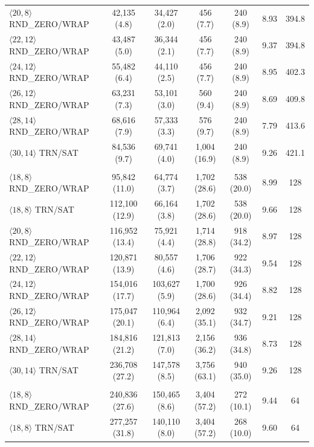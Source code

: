 \begin{table}[p]
\begin{tabular}{lcccccc}
$\langle 20,8\rangle$ RND\_ZERO/WRAP & 42,135 (4.8) & 34,427 (2.0) & 456 (7.7) & 240 (8.9) & 8.93 & 394.8 \\
$\langle 22,12\rangle$ RND\_ZERO/WRAP & 43,487 (5.0) & 36,344 (2.1) & 456 (7.7) & 240 (8.9) & 9.37 & 394.8 \\
$\langle 24,12\rangle$ RND\_ZERO/WRAP & 55,482 (6.4) & 44,110 (2.5) & 456 (7.7) & 240 (8.9) & 8.95 & 402.3 \\
$\langle 26,12\rangle$ RND\_ZERO/WRAP & 63,231 (7.3) & 53,101 (3.0) & 560 (9.4) & 240 (8.9) & 8.69 & 409.8 \\
$\langle 28,14\rangle$ RND\_ZERO/WRAP & 68,616 (7.9) & 57,333 (3.3) & 576 (9.7) & 240 (8.9) & 7.79 & 413.6 \\
$\langle 30,14\rangle$ TRN/SAT & 84,536 (9.7) & 69,741 (4.0) & 1,004 (16.9) & 240 (8.9) & 9.26 & 421.1 \\
\addlinespace
\multicolumn{7}{l}{\textbf{TDLA30-300 (limit: 151 cycles)}} \\
$\langle 18,8\rangle$ RND\_ZERO/WRAP & 95,842 (11.0) & 64,774 (3.7) & 1,702 (28.6) & 538 (20.0) & 8.99 & 128 \\
$\langle 18,8\rangle$ TRN/SAT & 112,100 (12.9) & 66,164 (3.8) & 1,702 (28.6) & 538 (20.0) & 9.66 & 128 \\
$\langle 20,8\rangle$ RND\_ZERO/WRAP & 116,952 (13.4) & 75,921 (4.4) & 1,714 (28.8) & 918 (34.2) & 8.97 & 128 \\
$\langle 22,12\rangle$ RND\_ZERO/WRAP & 120,871 (13.9) & 80,557 (4.6) & 1,706 (28.7) & 922 (34.3) & 9.54 & 128 \\
$\langle 24,12\rangle$ RND\_ZERO/WRAP & 154,016 (17.7) & 103,627 (5.9) & 1,700 (28.6) & 926 (34.4) & 8.82 & 128 \\
$\langle 26,12\rangle$ RND\_ZERO/WRAP & 175,047 (20.1) & 110,964 (6.4) & 2,092 (35.1) & 932 (34.7) & 9.21 & 128 \\
$\langle 28,14\rangle$ RND\_ZERO/WRAP & 184,816 (21.2) & 121,813 (7.0) & 2,156 (36.2) & 936 (34.8) & 8.73 & 128 \\
$\langle 30,14\rangle$ TRN/SAT & 236,708 (27.2) & 147,578 (8.5) & 3,756 (63.1) & 940 (35.0) & 9.26 & 128 \\
\addlinespace
\multicolumn{7}{l}{\textbf{TDLB100-400 (limit: 113 cycles)}} \\
$\langle 18,8\rangle$ RND\_ZERO/WRAP & 240,836 (27.6) & 150,465 (8.6) & 3,404 (57.2) & 272 (10.1) & 9.44 & 64 \\
$\langle 18,8\rangle$ TRN/SAT & 277,257 (31.8) & 140,110 (8.0) & 3,404 (57.2) & 268 (10.0) & 9.60 & 64 \\

\end{tabular}
\end{table}
